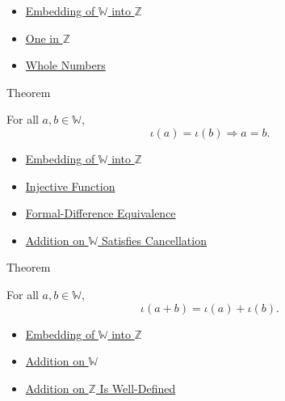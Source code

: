 \begin{dependencies}
\begin{itemize}
  \item \hyperref[def:canonical-embedding-w-into-z]{Embedding of $\mathbb{W}$ into $\mathbb{Z}$}
  \item \hyperref[def:one-in-z]{One in $\mathbb{Z}$}
  \item \hyperref[def:whole-numbers]{Whole Numbers}
\end{itemize}
\end{dependencies}

\begin{theorembox}{Theorem}
\begin{theorem}
\label{thm:embedding-w-into-z-injective}
For all $a,b\in\mathbb{W}$,
\[
\iota(a)=\iota(b)\Longrightarrow a=b.
\]
\end{theorem}
\end{theorembox}

\begin{dependencies}
\begin{itemize}
  \item \hyperref[def:canonical-embedding-w-into-z]{Embedding of $\mathbb{W}$ into $\mathbb{Z}$}
  \item \hyperref[def:injective]{Injective Function}
  \item \hyperref[def:formal-difference-equivalence]{Formal-Difference Equivalence}
  \item \hyperref[thm:addition-on-w-cancellation]{Addition on $\mathbb{W}$ Satisfies Cancellation}
\end{itemize}
\end{dependencies}

\begin{theorembox}{Theorem}
\begin{theorem}
\label{thm:embedding-w-into-z-preserves-addition}
For all $a,b\in\mathbb{W}$,
\[
\iota(a+b)=\iota(a)+\iota(b).
\]
\end{theorem}
\end{theorembox}

\begin{dependencies}
\begin{itemize}
  \item \hyperref[def:canonical-embedding-w-into-z]{Embedding of $\mathbb{W}$ into $\mathbb{Z}$}
  \item \hyperref[def:addition-on-w]{Addition on $\mathbb{W}$}
  \item \hyperref[thm:addition-on-z-well-defined]{Addition on $\mathbb{Z}$ Is Well-Defined}
\end{itemize}
\end{dependencies}

